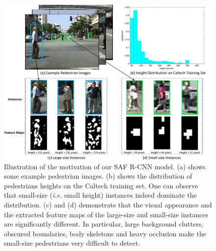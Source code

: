 \documentclass[journal]{IEEEtran}
\begin{document}
\begin{figure}
	\begin{center}
		\includegraphics[scale=0.32]{figures/framework1.pdf}
		\caption{Illustration of the motivation of our SAF R-CNN model. (a) shows some example pedestrian images. (b) shows the distribution of pedestrians heights on the Caltech training set. One can observe that small-size (\emph{i.e.} small height) instances indeed dominate the distribution. (c) and (d) demonstrate that the visual appearance and the extracted feature maps of the large-size and small-size instances are significantly different. 
			In particular, large background clutters, obscured boundaries, body skeletons and heavy occlusion make the small-size pedestrians very difficult to detect.
		}
		\label{fig:motivation}
	\end{center}
	\vspace{-4mm}
\end{figure}
\end{document}
